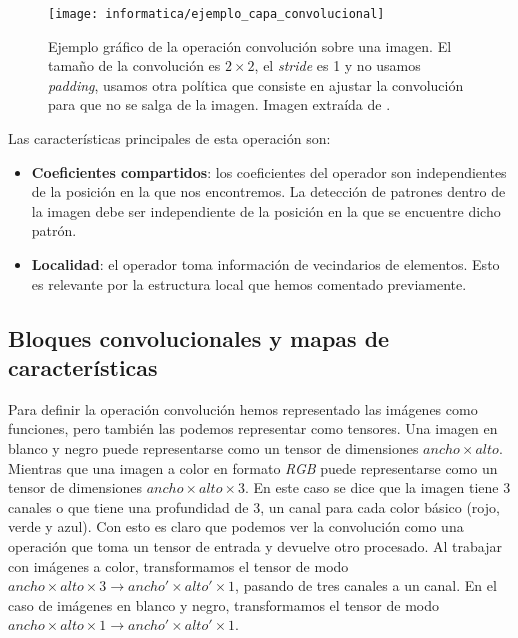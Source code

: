 \begin{figure}[H]
    \centering
    \texttt{[image: informatica/ejemplo\_capa\_convolucional]}
    \caption{Ejemplo gráfico de la operación convolución sobre una imagen. El tamaño de la convolución es $2 \times 2$, el \textit{stride} es 1 y no usamos \textit{padding}, usamos otra política que consiste en ajustar la convolución para que no se salga de la imagen. Imagen extraída de \cite{informatica:paper_definicion_cnn}.}
\end{figure}

Las características principales de esta operación son:

\begin{itemize}
    \item \textbf{Coeficientes compartidos}: los coeficientes del operador son independientes de la posición en la que nos encontremos. La detección de patrones dentro de la imagen debe ser independiente de la posición en la que se encuentre dicho patrón.
    \item \textbf{Localidad}: el operador toma información de vecindarios de elementos. Esto es relevante por la estructura local que hemos comentado previamente.
\end{itemize}

\subsection{Bloques convolucionales y mapas de características}

Para definir la operación convolución hemos representado las imágenes como funciones, pero también las podemos representar como tensores. Una imagen en blanco y negro puede representarse como un tensor de dimensiones $ancho \times alto$. Mientras que una imagen a color en formato \textit{RGB} puede representarse como un tensor de dimensiones $ancho \times alto \times 3$. En este caso se dice que la imagen tiene 3 canales o que tiene una profundidad de 3, un canal para cada color básico (rojo, verde y azul). Con esto es claro que podemos ver la convolución como una operación que toma un tensor de entrada y devuelve otro procesado. Al trabajar con imágenes a color, transformamos el tensor de modo $ancho \times alto \times 3 \to ancho' \times alto' \times 1$, pasando de tres canales a un canal. En el caso de imágenes en blanco y negro, transformamos el tensor de modo $ancho \times alto \times 1 \to ancho' \times alto' \times 1$.

